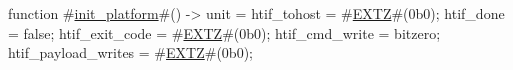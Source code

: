 function #\hyperref[sailRISCVzinitzyplatform]{init\_platform}#() -> unit = {
  htif_tohost = #\hyperref[sailRISCVzEXTZ]{EXTZ}#(0b0);
  htif_done   = false;
  htif_exit_code = #\hyperref[sailRISCVzEXTZ]{EXTZ}#(0b0);
  htif_cmd_write = bitzero;
  htif_payload_writes = #\hyperref[sailRISCVzEXTZ]{EXTZ}#(0b0);
}
